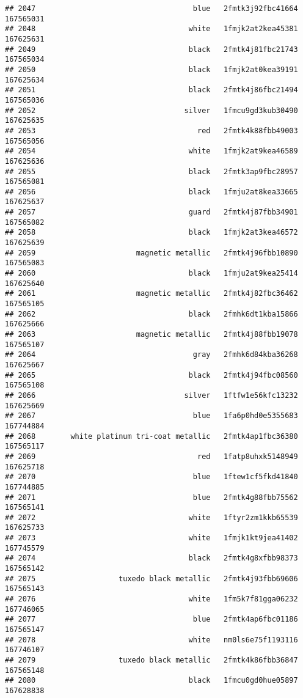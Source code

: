 \documentclass[
]{article}
\begin{document}
\begin{verbatim}
## 2047                                    blue   2fmtk3j92fbc41664 167565031
## 2048                                   white   1fmjk2at2kea45381 167625631
## 2049                                   black   2fmtk4j81fbc21743 167565034
## 2050                                   black   1fmjk2at0kea39191 167625634
## 2051                                   black   2fmtk4j86fbc21494 167565036
## 2052                                  silver   1fmcu9gd3kub30490 167625635
## 2053                                     red   2fmtk4k88fbb49003 167565056
## 2054                                   white   1fmjk2at9kea46589 167625636
## 2055                                   black   2fmtk3ap9fbc28957 167565081
## 2056                                   black   1fmju2at8kea33665 167625637
## 2057                                   guard   2fmtk4j87fbb34901 167565082
## 2058                                   black   1fmjk2at3kea46572 167625639
## 2059                       magnetic metallic   2fmtk4j96fbb10890 167565083
## 2060                                   black   1fmju2at9kea25414 167625640
## 2061                       magnetic metallic   2fmtk4j82fbc36462 167565105
## 2062                                   black   2fmhk6dt1kba15866 167625666
## 2063                       magnetic metallic   2fmtk4j88fbb19078 167565107
## 2064                                    gray   2fmhk6d84kba36268 167625667
## 2065                                   black   2fmtk4j94fbc08560 167565108
## 2066                                  silver   1ftfw1e56kfc13232 167625669
## 2067                                    blue   1fa6p0hd0e5355683 167744884
## 2068        white platinum tri-coat metallic   2fmtk4ap1fbc36380 167565117
## 2069                                     red   1fatp8uhxk5148949 167625718
## 2070                                    blue   1ftew1cf5fkd41840 167744885
## 2071                                    blue   2fmtk4g88fbb75562 167565141
## 2072                                   white   1ftyr2zm1kkb65539 167625733
## 2073                                   white   1fmjk1kt9jea41402 167745579
## 2074                                   black   2fmtk4g8xfbb98373 167565142
## 2075                   tuxedo black metallic   2fmtk4j93fbb69606 167565143
## 2076                                   white   1fm5k7f81gga06232 167746065
## 2077                                    blue   2fmtk4ap6fbc01186 167565147
## 2078                                   white   nm0ls6e75f1193116 167746107
## 2079                   tuxedo black metallic   2fmtk4k86fbb36847 167565148
## 2080                                   black   1fmcu0gd0hue05897 167628838

\end{verbatim}
\end{document}

